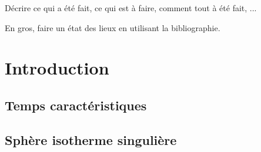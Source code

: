 Décrire ce qui a été fait, ce qui est à faire, comment tout à été fait, ...

En gros, faire un état des lieux en utilisant la bibliographie.

\chapter{Introduction}%
	\minitoc
	

	\section{Temps caractéristiques}

%		
		

	\section{Sphère isotherme singulière}
		

